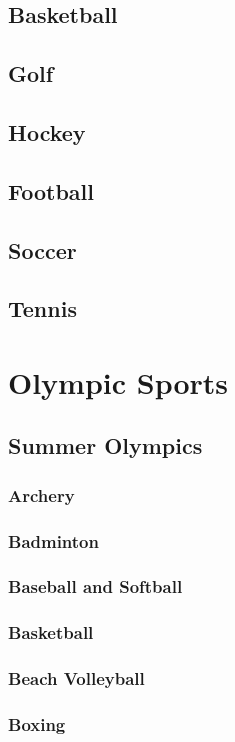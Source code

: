 		\subsection{Basketball}
		\subsection{Golf}
		\subsection{Hockey}
		\subsection{Football}
		\subsection{Soccer}
		\subsection{Tennis}
	\newpage
	\section{Olympic Sports}
	
		\subsection{Summer Olympics}
			\subsubsection{Archery}
			\subsubsection{Badminton}
			\subsubsection{Baseball and Softball}
			\subsubsection{Basketball}
			\subsubsection{Beach Volleyball}
			\subsubsection{Boxing}
